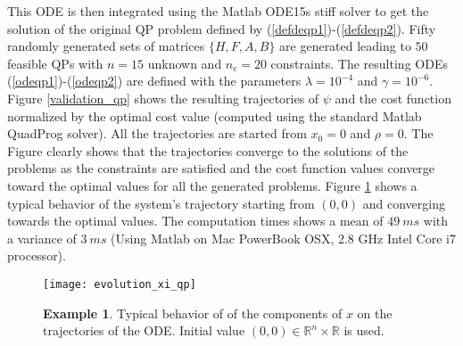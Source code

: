 \documentclass{article}
\begin{document}
This ODE is then integrated using the Matlab ODE15s stiff solver to get the solution of the original QP problem defined by (\ref{defdeqp1})-(\ref{defdeqp2}). Fifty randomly generated sets of matrices $\{H,F,A,B\}$ are generated leading to $50$ feasible QPs with $n=15$ unknown and $n_c=20$ constraints. The resulting ODEs (\ref{odeqp1})-(\ref{odeqp2}) are defined with the parameters $\lambda=10^{-4}$ and $\gamma=10^{-6}$. Figure \ref{validation_qp} shows the resulting trajectories of $\psi$ and the cost function normalized by the optimal cost value (computed using the standard Matlab QuadProg solver). All the trajectories are started from $x_0=0$ and $\rho=0$. The Figure clearly shows that the trajectories converge to the solutions of the problems as the constraints are satisfied and the cost function values converge toward the optimal values for all the generated problems. 
Figure \ref{evolution_xi_qp} shows a typical behavior of the system's trajectory starting from $(0,0)$ and converging towards the optimal values. The computation times shows a mean of $49\ ms$ with a variance of $3\ ms$ (Using Matlab on Mac PowerBook OSX, 2.8 GHz Intel Core i7 processor).
\begin{figure}
\begin{center}
\texttt{[image: evolution\_xi\_qp]}
\end{center} 
\caption{{\bf Example 1}. Typical behavior of of the components of $x$ on the trajectories of the ODE. Initial value $(0,0)\in \mathbb{R}^{n}\times \mathbb{R}$ is used.}\label{evolution_xi_qp}
\end{figure}
\end{document}

